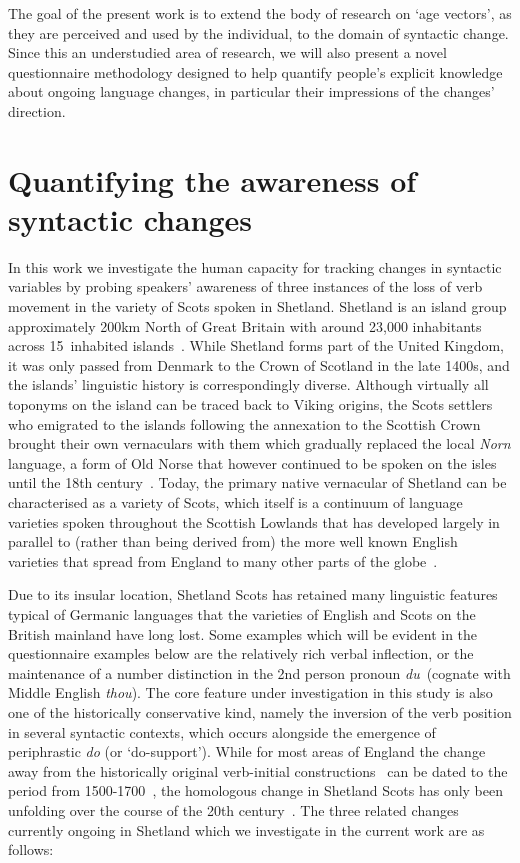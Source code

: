 The goal of the present work is to extend the body of research on `age vectors', as they are perceived and used by the individual, to the domain of syntactic change. Since this an understudied area of research, we will also present a novel questionnaire methodology designed to help quantify people's explicit knowledge about ongoing language changes, in particular their impressions of the changes' direction.

\section{Quantifying the awareness of syntactic changes}

In this work we investigate the human capacity for tracking changes in syntactic variables by probing speakers' awareness of three instances of the loss of verb movement in the variety of Scots spoken in Shetland. Shetland is an island group approximately 200km North of Great Britain with around 23,000 inhabitants across 15~inhabited islands~\citep[see also Figure~\ref{fig:shetland}]{Shetland2014}. While Shetland forms part of the United Kingdom, it was only passed from Denmark to the Crown of Scotland in the late 1400s, and the islands' linguistic history is correspondingly diverse. Although virtually all toponyms on the island can be traced back to Viking origins, the Scots settlers who emigrated to the islands following the annexation to the Scottish Crown brought their own vernaculars with them which gradually replaced the local \emph{Norn} language, a form of Old Norse that however continued to be spoken on the isles until the 18th century~\citep{Knooihuizen2009}. Today, the primary native vernacular of Shetland can be characterised as a variety of Scots, which itself is a continuum of language varieties spoken throughout the Scottish Lowlands that has developed largely in parallel to (rather than being derived from) the more well known English varieties that spread from England to many other parts of the globe~\citep[p.15]{Millar2007}.

Due to its insular location, Shetland Scots has retained many linguistic features typical of Germanic languages that the varieties of English and Scots on the British mainland have long lost. Some examples which will be evident in the questionnaire examples below are the relatively rich verbal inflection, or the maintenance of a number distinction in the 2nd person pronoun \emph{du}~(cognate with Middle English \emph{thou}). The core feature under investigation in this study is also one of the historically conservative kind, namely the inversion of the verb position in several syntactic contexts, which occurs alongside the emergence of periphrastic \emph{do} (or `do-support').
While for most areas of England the change away from the historically original verb-initial constructions~\citep[see][for a more detailed analysis]{Jamieson2015} can be dated to the period from 1500-1700~\citep{Ellegard1953,Kroch1989do}, the homologous change in Shetland Scots has only been unfolding over the course of the 20th century~\citep{Jonas2002}. %
The three related changes currently ongoing in Shetland which we investigate in the current work are as follows:

